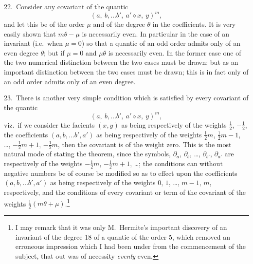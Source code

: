 \documentclass[11pt,a4paper]{article}
\begin{document}
\medskip

22.\ Consider any covariant of the quantic
\[
(a,\ b,\ldots b',\ a' \diamond x,\ y)^m,
\]
and let this be of the order $\mu$ and of the degree $\theta$ in the coefficients. It is very easily shown that $m\theta - \mu$ is necessarily even. In particular in the case of an invariant (i.e.\ when $\mu = 0$) so that a quantic of an odd order admits only of an even degree $\theta$; but if $\mu = 0$ and $\mu\theta$ is necessarily even. In the former case one of the two numerical distinction between the two cases must be drawn; but as an important distinction between the two cases must be drawn; this is in fact only of an odd order admits only of an even degree.

\medskip

23.\ There is another very simple condition which is satisfied by every covariant of the quantic
\[
(a,\ b,\ldots b',\ a' \diamond x,\ y)^m,
\]
viz.\ if we consider the facients $(x, y)$ as being respectively of the weights $\tfrac{1}{2}$, $-\tfrac{1}{2}$, the coefficients $(a, b, \ldots b', a')$ as being respectively of the weights $\tfrac{1}{2}m$, $\tfrac{1}{2}m - 1$, \ldots, $-\tfrac{1}{2}m + 1$, $-\tfrac{1}{2}m$, then the covariant is of the weight zero. This is the most natural mode of stating the theorem, since the symbols, $\partial_a$, $\partial_b$, \ldots, $\partial_{b'}$, $\partial_{a'}$ are respectively of the weights $-\tfrac{1}{2}m$, $-\tfrac{1}{2}m + 1$, \ldots; the conditions can without negative numbers be of course be modified so as to effect upon the coefficients $(a, b, \ldots b', a')$ as being respectively of the weights $0$, $1$, \ldots, $m - 1$, $m$, respectively, and the conditions of every covariant or term of the covariant of the weights $\tfrac{1}{2}(m\theta + \mu)$.\footnote{I may remark that it was only M.~Hermite's important discovery of an invariant of the degree 18 of a quantic of the order 5, which removed an erroneous impression which I had been under from the commencement of the subject, that out was of necessity \textit{evenly} even.}

\medskip
\end{document}

